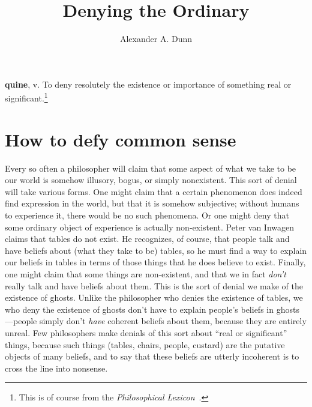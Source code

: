\documentclass[11pt]{article}
\title{Denying the Ordinary}
\author{Alexander A. Dunn}
\newenvironment{squote}{\begin{quote}\begin{singlespace}}{\end{singlespace}\end{quote}}
\begin{document}
\ifstandalone
\maketitle
\begin{spacing}{1.5}
\fi


\begin{center}
	\textbf{quine}, v. To deny resolutely the existence or importance of something real or significant.\footnote{This is of course from the {\em Philosophical Lexicon}~\citep{dennett2008}.}
\end{center}\vspace{5pt}

\section{How to defy common sense}
\label{denials}
Every so often a philosopher will claim that some aspect of what we take to be our world is somehow illusory, bogus, or simply nonexistent. This sort of denial will take various forms. One might claim that a certain phenomenon does indeed find expression in the world, but that it is somehow subjective; without humans to experience it, there would be no such phenomena. Or one might deny that some ordinary object of experience is actually non-existent. Peter van Inwagen claims that tables do not exist. He recognizes, of course, that people talk and have beliefs about (what they take to be) tables, so he must find a way to explain our beliefs in tables in terms of those things that he does believe to exist. Finally, one might claim that some things are non-existent, and that we in fact {\em don't} really talk and have beliefs about them. This is the sort of denial we make of the existence of ghosts. Unlike the philosopher who denies the existence of tables, we who deny the existence of ghosts don't have to explain people's beliefs in ghosts---people simply don't {\em have} coherent beliefs about them, because they are entirely unreal. Few philosophers make denials of this sort about ``real or significant'' things, because such things (tables, chairs, people, custard) are the putative objects of many beliefs, and to say that these beliefs are utterly incoherent is to cross the line into nonsense.%


\end{spacing}
\end{document}
